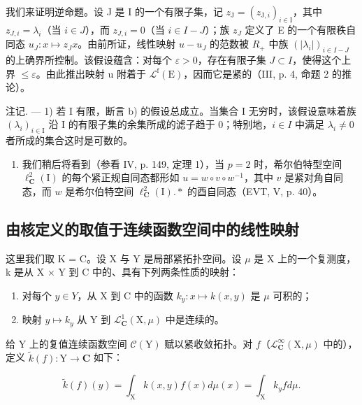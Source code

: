 我们来证明逆命题。设 J 是 I 的一个有限子集，记 \(z_{\mathrm{J}} = (z_{\mathrm{J},i})_{i \in \mathrm{I}}\)，其中 \(z_{J,i} = \lambda_i\)（当 \(i \in J\)），而 \(z_{J,i} = 0\)（当 \(i \in I - J\)）；族 \(z_J\) 定义了 E 的一个有限秩自同态 \(u_J \colon x \mapsto z_J x\)。由前所证，线性映射 \(u - u_J\) 的范数被 \(R_+\) 中族 \((|\lambda_i|)_{i \in I-J}\) 的上确界所控制。该假设蕴含：对每个 \(\varepsilon > 0\)，存在有限子集 \(J \subset I\)，使得这个上界 \(\leqslant \varepsilon\)。由此推出映射 u 附着于 \(\mathcal{L}^{\mathrm{f}}(\mathrm{E})\)，因而它是紧的（III, p. 4, 命题 2 的推论）。

注记. --- 1) 若 I 有限，断言 b) 的假设总成立。当集合 I 无穷时，该假设意味着族 \((\lambda_{i})_{i\in\mathrm{I}}\) 沿 I 的有限子集的余集所成的滤子趋于 0；特别地，\(i\in I\) 中满足 \(\lambda_{i}\neq0\) 者所成的集合这时是可数的。

\begin{enumerate}
\def\labelenumi{\arabic{enumi})}
\setcounter{enumi}{1}
\tightlist
\item
  我们稍后将看到（参看 IV, p. 149, 定理 1），当 \(p = 2\) 时，希尔伯特型空间 \(\ell_{\mathbf{C}}^{2}(\mathrm{I})\) 的每个紧正规自同态都形如 \(u = w \circ v \circ w^{-1}\)，其中 \(v\) 是紧对角自同态，而 \(w\) 是希尔伯特空间 \(\ell_{\mathbf{C}}^{2}(\mathrm{I}).*\) 的酉自同态（EVT, V, p. 40）。
\end{enumerate}

\subsection{由核定义的取值于连续函数空间中的线性映射}

这里我们取 K = C。设 X 与 Y 是局部紧拓扑空间。设 \(\mu\) 是 X 上的一个复测度，k 是从 X × Y 到 C 中的、具有下列两条性质的映射：

\begin{enumerate}
\def\labelenumi{(\roman{enumi})}
\item
  对每个 \(y \in Y\)，从 X 到 C 中的函数 \(k_{y} \colon x \mapsto k(x, y)\) 是 \(\mu\) 可积的；
\item
  映射 \(y \mapsto k_{y}\) 从 Y 到 \(\mathcal{L}_{\mathbf{C}}^{1}(\mathrm{X}, \mu)\) 中是连续的。
\end{enumerate}

给 Y 上的复值连续函数空间 \(\mathcal{C}(\mathrm{Y})\) 赋以紧收敛拓扑。对 \(f\)（\(\mathcal{L}_{\mathbf{C}}^{\infty}(\mathrm{X},\mu)\) 中的），定义 \(\widetilde{k}(f)\colon \mathrm{Y}\to \mathbf{C}\) 如下：

\[
\widetilde {k} (f) (y) = \int_ {\mathrm{X}} k (x, y) f (x) d \mu (x) = \int_ {\mathrm{X}} k _ {y} f d \mu .\tag{1}
\]

